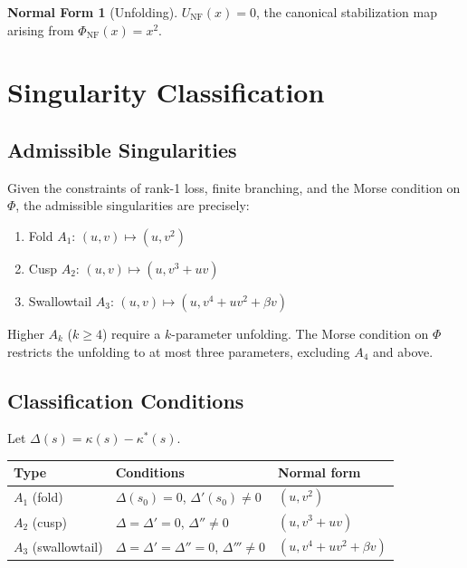 \documentclass[12pt, oneside]{book}
\theoremstyle{plain}
\theoremstyle{definition}
\newtheorem{normalform}{Normal Form}[section]
\theoremstyle{remark}
\begin{document}
\begin{normalform}[Unfolding]
$U_{\mathrm{NF}}(x) = 0$, the canonical stabilization map arising
from $\Phi_{\mathrm{NF}}(x) = x^2$.
\end{normalform}

\section{Singularity Classification}

\subsection{Admissible Singularities}

Given the constraints of rank-1 loss, finite branching, and the Morse
condition on $\Phi$, the admissible singularities are precisely:

\begin{enumerate}
\item Fold $A_1$: $(u,v) \mapsto (u, v^2)$
\item Cusp $A_2$: $(u,v) \mapsto (u, v^3 + uv)$
\item Swallowtail $A_3$: $(u,v) \mapsto (u, v^4 + uv^2 + \beta v)$
\end{enumerate}

Higher $A_k$ ($k \ge 4$) require a $k$-parameter unfolding. The Morse
condition on $\Phi$ restricts the unfolding to at most three
parameters, excluding $A_4$ and above.

\subsection{Classification Conditions}

Let $\Delta(s) = \kappa(s) - \kappa^*(s)$.

\begin{center}
\begin{tabular}{lll}
\toprule
Type & Conditions & Normal form \\
\midrule
$A_1$ (fold) & $\Delta(s_0)=0$, $\Delta'(s_0)\ne 0$ & $(u,v^2)$ \\
$A_2$ (cusp) & $\Delta=\Delta'=0$, $\Delta''\ne 0$ & $(u,v^3+uv)$ \\
$A_3$ (swallowtail) & $\Delta=\Delta'=\Delta''=0$, $\Delta'''\ne 0$
  & $(u,v^4+uv^2+\beta v)$ \\
\bottomrule
\end{tabular}
\end{center}
\end{document}
